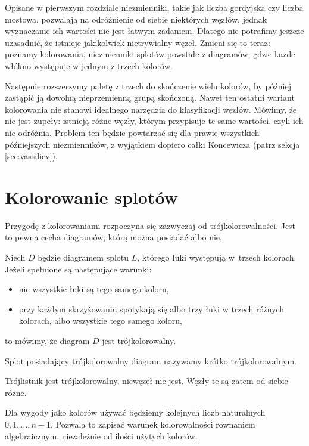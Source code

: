 
Opisane w pierwszym rozdziale niezmienniki, takie jak liczba gordyjska czy liczba mostowa, pozwalają na odróżnienie od siebie niektórych węzłów, jednak wyznaczanie ich wartości nie jest łatwym zadaniem.
Dlatego nie potrafimy jeszcze uzasadnić, że istnieje jakikolwiek nietrywialny węzeł.
Zmieni się to teraz: poznamy kolorowania, niezmienniki splotów powstałe z diagramów, gdzie każde włókno występuje w jednym z trzech kolorów.

Następnie rozszerzymy paletę z trzech do skończenie wielu kolorów, by później zastąpić ją dowolną nieprzemienną grupą skończoną.
Nawet ten ostatni wariant kolorowania nie stanowi idealnego narzędzia do klasyfikacji węzłów.
Mówimy, że nie jest zupeły: istnieją różne węzły, którym przypisuje te same wartości, czyli ich nie odróżnia.
Problem ten będzie powtarzać się dla prawie wszystkich późniejszych niezmienników, z wyjątkiem dopiero całki Koncewicza (patrz sekcja \ref{sec:vassiliev}).

\section{Kolorowanie splotów}

Przygodę z kolorowaniami rozpoczyna się zazwyczaj od trójkolorowalności.
Jest to pewna cecha diagramów, którą można posiadać albo nie.

\begin{definition}[trójkolorowalność]
%
    Niech $D$ będzie diagramem splotu $L$, którego łuki występują w~trzech kolorach.
    Jeżeli spełnione są następujące warunki:
    \begin{itemize}[leftmargin=*]
        \item nie wszystkie łuki są tego samego koloru,
        \item przy każdym skrzyżowaniu spotykają się albo trzy łuki w trzech różnych kolorach, albo wszystkie tego samego koloru,
    \end{itemize}
    to mówimy, że diagram $D$ jest trójkolorowalny.
\end{definition}

 Splot posiadający trójkolorowalny diagram nazywamy krótko trójkolorowalnym.

\begin{example}
    Trójlistnik jest trójkolorowalny, niewęzeł nie jest.
    Węzły te są zatem od siebie różne.
\end{example}

Dla wygody jako kolorów używać będziemy kolejnych liczb naturalnych $0, 1, \ldots, n-1$.
Pozwala to zapisać warunek kolorowalności równaniem algebraicznym, niezależnie od ilości użytych kolorów.

